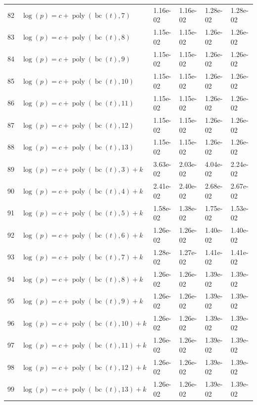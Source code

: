 \documentclass[12pt,a4paper]{article}
\DeclareMathOperator{\bc}{bc}
\DeclareMathOperator{\poly}{poly}
\begin{document}
\begin{longtable}[t]{ll>{\raggedleft\arraybackslash}p{2cm}>{\raggedleft\arraybackslash}p{2cm}>{\raggedleft\arraybackslash}p{2cm}>{\raggedleft\arraybackslash}p{2cm}}
82 & $\log(p) = c + \poly\left( \bc(t), 7 \right)$ & 1.16e-02 & 1.16e-02 & 1.28e-02 & 1.28e-02\\
\rowcolor{gray!6}  83 & $\log(p) = c + \poly\left( \bc(t), 8 \right)$ & 1.15e-02 & 1.15e-02 & 1.26e-02 & 1.26e-02\\
84 & $\log(p) = c + \poly\left( \bc(t), 9 \right)$ & 1.15e-02 & 1.15e-02 & 1.26e-02 & 1.26e-02\\
\rowcolor{gray!6}  85 & $\log(p) = c + \poly\left( \bc(t), 10 \right)$ & 1.15e-02 & 1.15e-02 & 1.26e-02 & 1.26e-02\\
86 & $\log(p) = c + \poly\left( \bc(t), 11 \right)$ & 1.15e-02 & 1.15e-02 & 1.26e-02 & 1.26e-02\\
\rowcolor{gray!6}  87 & $\log(p) = c + \poly\left( \bc(t), 12 \right)$ & 1.15e-02 & 1.15e-02 & 1.26e-02 & 1.26e-02\\
88 & $\log(p) = c + \poly\left( \bc(t), 13 \right)$ & 1.15e-02 & 1.15e-02 & 1.26e-02 & 1.26e-02\\
\rowcolor{gray!6}  89 & $\log(p) = c + \poly\left( \bc(t), 3 \right) + k$ & 3.63e-02 & 2.03e-02 & 4.04e-02 & 2.24e-02\\
90 & $\log(p) = c + \poly\left( \bc(t), 4 \right) + k$ & 2.41e-02 & 2.40e-02 & 2.68e-02 & 2.67e-02\\
\rowcolor{gray!6}  91 & $\log(p) = c + \poly\left( \bc(t), 5 \right) + k$ & 1.58e-02 & 1.38e-02 & 1.75e-02 & 1.53e-02\\
92 & $\log(p) = c + \poly\left( \bc(t), 6 \right) + k$ & 1.26e-02 & 1.26e-02 & 1.40e-02 & 1.40e-02\\
\rowcolor{gray!6}  93 & $\log(p) = c + \poly\left( \bc(t), 7 \right) + k$ & 1.28e-02 & 1.27e-02 & 1.41e-02 & 1.41e-02\\
94 & $\log(p) = c + \poly\left( \bc(t), 8 \right) + k$ & 1.26e-02 & 1.26e-02 & 1.39e-02 & 1.39e-02\\
\rowcolor{gray!6}  95 & $\log(p) = c + \poly\left( \bc(t), 9 \right) + k$ & 1.26e-02 & 1.26e-02 & 1.39e-02 & 1.39e-02\\
96 & $\log(p) = c + \poly\left( \bc(t), 10 \right) + k$ & 1.26e-02 & 1.26e-02 & 1.39e-02 & 1.39e-02\\
\rowcolor{gray!6}  97 & $\log(p) = c + \poly\left( \bc(t), 11 \right) + k$ & 1.26e-02 & 1.26e-02 & 1.39e-02 & 1.39e-02\\
98 & $\log(p) = c + \poly\left( \bc(t), 12 \right) + k$ & 1.26e-02 & 1.26e-02 & 1.39e-02 & 1.39e-02\\
\rowcolor{gray!6}  99 & $\log(p) = c + \poly\left( \bc(t), 13 \right) + k$ & 1.26e-02 & 1.26e-02 & 1.39e-02 & 1.39e-02\\

\end{longtable}
\end{document}
